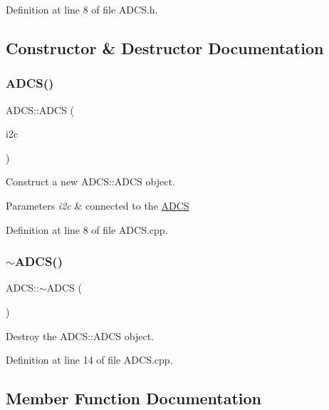 Definition at line 8 of file A\+D\+C\+S.\+h.



\subsection{Constructor \& Destructor Documentation}
\mbox{\label{class_a_d_c_s_ac25de50b23a20e173b0e4ea0d7df7f04}} 
\subsubsection{\texorpdfstring{ADCS()}{ADCS()}}
{\footnotesize\ttfamily A\+D\+C\+S\+::\+A\+D\+CS (\begin{DoxyParamCaption}\item[{I2C \&}]{i2c }\end{DoxyParamCaption})}



Construct a new A\+D\+C\+S\+::\+A\+D\+CS object. 


\begin{DoxyParams}{Parameters}
{\em i2c} & connected to the \mbox{\hyperlink{class_a_d_c_s}{A\+D\+CS}} \\
\hline
\end{DoxyParams}


Definition at line 8 of file A\+D\+C\+S.\+cpp.

\mbox{\label{class_a_d_c_s_a64926eda19fc2e58876c62616ab0b068}} 
\subsubsection{\texorpdfstring{$\sim$ADCS()}{~ADCS()}}
{\footnotesize\ttfamily A\+D\+C\+S\+::$\sim$\+A\+D\+CS (\begin{DoxyParamCaption}{ }\end{DoxyParamCaption})}



Destroy the A\+D\+C\+S\+::\+A\+D\+CS object. 



Definition at line 14 of file A\+D\+C\+S.\+cpp.



\subsection{Member Function Documentation}
\mbox{\label{class_a_d_c_s_a5a4196a5298a2e804ee85f2965b31133}} 
